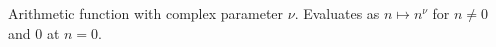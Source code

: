 \begin{definition}[powR]
\label{powR}
\leanok
Arithmetic function with complex parameter $\nu$. Evaluates as $n\mapsto n^{\nu}$ for $n\neq 0$ and $0$ at $n=0$.
\end{definition}
